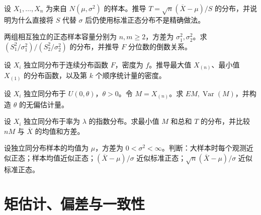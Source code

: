 \begin{exercise}[学生 t 统计量]\label{q:B8.5}
设 $X_1,\ldots,X_n$ 为来自 $N(\mu,\sigma^2)$ 的样本。推导 $T=\sqrt n(\overline X-\mu)/S$ 的分布，并说明为什么直接将 $S$ 代替 $\sigma$ 后仍使用标准正态分布不是精确做法。\par{}\end{exercise}

\begin{exercise}[方差比与 F 分布]\label{q:B8.6}
两组相互独立的正态样本容量分别为 $n,m\ge2$，方差为 $\sigma_1^2,\sigma_2^2$。求 $(S_1^2/\sigma_1^2)/(S_2^2/\sigma_2^2)$ 的分布，并推导 $F$ 分位数的倒数关系。\par{}\end{exercise}

\begin{exercise}[顺序统计量的分布]\label{q:B8.7}
设 $X_i$ 独立同分布于连续分布函数 $F$，密度为 $f$。推导最大值 $X_{(n)}$、最小值 $X_{(1)}$ 的分布函数，以及第 $k$ 个顺序统计量的密度。\par{}\end{exercise}

\begin{exercise}[均匀样本最大值]\label{q:B8.8}
设 $X_i$ 独立同分布于 $U(0,\theta)$，$\theta>0$。令 $M=X_{(n)}$。求 $EM,\operatorname{Var}(M)$，并构造 $\theta$ 的无偏估计量。\par{}\end{exercise}

\begin{exercise}[指数样本的最小值与和]\label{q:B8.9}
设 $X_i$ 独立同分布于率为 $\lambda$ 的指数分布。求最小值 $M$ 和总和 $T$ 的分布，并比较 $nM$ 与 $\overline X$ 的均值和方差。\par{}\end{exercise}

\begin{exercise}[中心极限定理的正确标准化]\label{q:M-F-C13}
设独立同分布样本的均值为 $\mu$，方差为 $0<\sigma^2<\infty$。判断：大样本时每个观测近似正态；样本均值近似正态；$(\overline X-\mu)/\sigma$ 近似标准正态；$\sqrt n(\overline X-\mu)/\sigma$ 近似标准正态。\par{}\end{exercise}

\clearpage\section{矩估计、偏差与一致性}

